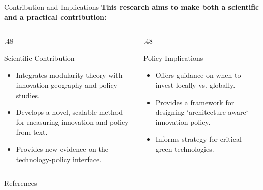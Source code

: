 \documentclass[10pt, aspectratio=169]{beamer}
\begin{document}
\begin{frame}{Contribution and Implications}
    \textbf{This research aims to make both a scientific and a practical contribution:}
    
    \vfill
    
    \begin{columns}[T]
        \begin{column}{.48\textwidth}
            \begin{block}{\textcolor{aauDarkBlue}{Scientific Contribution}}
                \begin{itemize}
                    \item Integrates modularity theory with innovation geography and policy studies.
                    \item Develops a novel, scalable method for measuring innovation and policy from text.
                    \item Provides new evidence on the technology-policy interface.
                \end{itemize}
            \end{block}
        \end{column}
        \begin{column}{.48\textwidth}
            \begin{block}{\textcolor{aauDarkGreen}{Policy Implications}}
                \begin{itemize}
                    \item Offers guidance on when to invest locally vs. globally.
                    \item Provides a framework for designing `architecture-aware` innovation policy.
                    \item Informs strategy for critical green technologies.
                \end{itemize}
            \end{block}
        \end{column}
    \end{columns}
\end{frame}

\begin{frame}[allowframebreaks]{References}
    \printbibliography
\end{frame}
\end{document}
